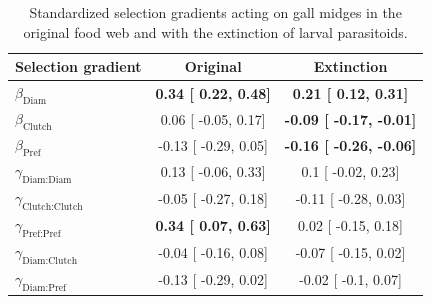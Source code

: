 \documentclass[11pt,]{article}
\begin{document}
\begin{table}[h]
\caption{Standardized selection gradients acting on gall midges in the original food web and with the extinction of larval parasitoids.}
\label{Table:Gradients}
\centering
\begin{tabular}{lcc} %
\\ 
\hline
\textbf{Selection gradient} & \textbf{Original} & \textbf{Extinction}   \\ %
\hline
$\beta_{\text{Diam}}$ & 
\textbf{
0.34 [
0.22,
0.48] }& 
\textbf{
0.21 [
0.12,
0.31] }\\%

$\beta_{\text{Clutch}}$ & 
0.06 [
-0.05,
0.17] & 
\textbf{
-0.09 [
-0.17,
-0.01] }\\%

$\beta_{\text{Pref}}$ &
-0.13 [
-0.29,
0.05] & 
\textbf{
-0.16 [
-0.26,
-0.06] }\\%


$\gamma_{\text{Diam:Diam}}$ &
0.13 [
-0.06,
0.33] & 

0.1 [
-0.02,
0.23] \\%


$\gamma_{\text{Clutch:Clutch}}$ & 
-0.05 [
-0.27,
0.18] & 

-0.11 [
-0.28,
0.03] \\%


$\gamma_{\text{Pref:Pref}}$ & 
\textbf{
0.34 [
0.07,
0.63] }& 

0.02 [
-0.15,
0.18] \\%

$\gamma_{\text{Diam:Clutch}}$ & 
-0.04 [
-0.16,
0.08] & 

-0.07 [
-0.15,
0.02] \\%


$\gamma_{\text{Diam:Pref}}$ & 
-0.13 [
-0.29,
0.02] & 

-0.02 [
-0.1,
0.07] \\%


\end{tabular}
\end{table}
\end{document}
